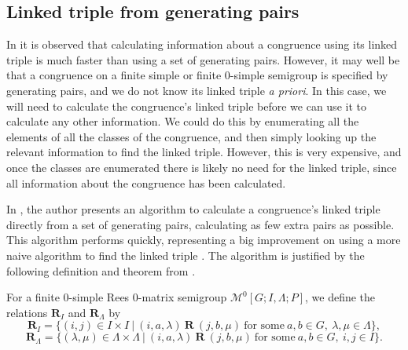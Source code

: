\subsection{Linked triple from generating pairs}
\label{sec:pairs-to-linked-triple}

In \cite[\S 6.1]{mtorpey_pre_msc} it is observed that calculating information
about a congruence using its linked triple is much faster than using a set of
generating pairs.  However, it may well be that a congruence on a finite
simple or finite 0-simple semigroup is specified by generating pairs, and we do
not know its linked triple \textit{a priori}.  In this case, we will need to
calculate the congruence's linked triple before we can use it to calculate any
other information.  We could do this by enumerating all the elements of all the
classes of the congruence, and then simply looking up the relevant information
to find the linked triple.  However, this is very expensive, and once the
classes are enumerated there is likely no need for the linked triple, since all
information about the congruence has been calculated.

In \cite[\S 3.2]{mtorpey_msc}, the author presents an algorithm to calculate a
congruence's linked triple directly from a set of generating pairs, calculating
as few extra pairs as possible.  This algorithm performs quickly, representing a
big improvement on using a more naive algorithm to find the linked triple
\cite[\S 6.1.2]{mtorpey_msc}.  The algorithm is justified by the following
definition and theorem from \cite{mtorpey_msc}.

\begin{definition}
  \label{def:ri}
  For a finite 0-simple Rees 0-matrix semigroup
  $\mathcal{M}^0[G;I,\Lambda;P]$, we define the relations
  $\mathbf{R}_I$ and $\mathbf{R}_\Lambda$ by
  $$\mathbf{R}_I = \big\{(i,j) \in I \times I ~\big|~
  (i,a,\lambda) ~\mathbf{R}~ (j,b,\mu) ~\text{for some}~
  a,b \in G,~\lambda,\mu \in \Lambda\big\},$$
  $$\mathbf{R}_\Lambda = \big\{(\lambda,\mu) \in \Lambda \times \Lambda ~\big|~
  (i,a,\lambda) ~\mathbf{R}~ (j,b,\mu) ~\text{for some}~
  a,b \in G,~i,j \in I\big\}.$$
\end{definition}

